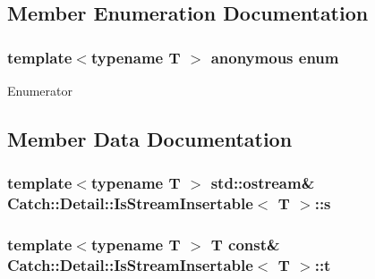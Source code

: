 \subsection{Member Enumeration Documentation}
\hypertarget{structCatch_1_1Detail_1_1IsStreamInsertable_a2e4508694da3bf368ff67733a7970edd}{\subsubsection[{anonymous enum}]{\setlength{\rightskip}{0pt plus 5cm}template$<$typename T $>$ anonymous enum}}\label{structCatch_1_1Detail_1_1IsStreamInsertable_a2e4508694da3bf368ff67733a7970edd}
\begin{Desc}
\item[Enumerator]\par
\begin{description}
\item[{\em 
\hypertarget{structCatch_1_1Detail_1_1IsStreamInsertable_a2e4508694da3bf368ff67733a7970edda765a324929702bfce2969fc19fc4f926}{value}\label{structCatch_1_1Detail_1_1IsStreamInsertable_a2e4508694da3bf368ff67733a7970edda765a324929702bfce2969fc19fc4f926}
}]\end{description}
\end{Desc}


\subsection{Member Data Documentation}
\hypertarget{structCatch_1_1Detail_1_1IsStreamInsertable_abe3d3c8e5d85665747faafffc9a96b00}{
\subsubsection[{s}]{\setlength{\rightskip}{0pt plus 5cm}template$<$typename T $>$ std\-::ostream\& {\bf Catch\-::\-Detail\-::\-Is\-Stream\-Insertable}$<$ T $>$\-::s\hspace{0.3cm}{\ttfamily [static]}}}\label{structCatch_1_1Detail_1_1IsStreamInsertable_abe3d3c8e5d85665747faafffc9a96b00}
\hypertarget{structCatch_1_1Detail_1_1IsStreamInsertable_a7d2a3da978b6736667a7b2f6d51f507f}{
\subsubsection[{t}]{\setlength{\rightskip}{0pt plus 5cm}template$<$typename T $>$ T const\& {\bf Catch\-::\-Detail\-::\-Is\-Stream\-Insertable}$<$ T $>$\-::t\hspace{0.3cm}{\ttfamily [static]}}}\label{structCatch_1_1Detail_1_1IsStreamInsertable_a7d2a3da978b6736667a7b2f6d51f507f}



